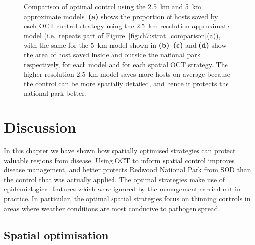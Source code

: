 \begin{figure}[H]
    \begin{center}
        \caption[Comparison of optimal control using the \SI{2.5}{\km} and \SI{5}{\km} models]{Comparison of optimal control using the \SI{2.5}{\km} and \SI{5}{\km} approximate models. \textbf{(a)} shows the proportion of hosts saved by each OCT control strategy using the \SI{2.5}{\km} resolution approximate model (i.e.\ repeats part of Figure~\ref{fig:ch7:strat_comparison}(a)), with the same for the \SI{5}{\km} model shown in \textbf{(b)}. \textbf{(c)} and \textbf{(d)} show the area of host saved inside and outside the national park respectively, for each model and for each spatial OCT strategy. The higher resolution \SI{2.5}{\km} model saves more hosts on average because the control can be more spatially detailed, and hence it protects the national park better.\label{fig:ch7:control_res_compare}}
    \end{center}
\end{figure}

\newpage
\section{Discussion}

In this chapter we have shown how spatially optimised strategies can protect valuable regions from disease. Using OCT to inform spatial control improves disease management, and better protects Redwood National Park from SOD than the control that was actually applied. The optimal strategies make use of epidemiological features which were ignored by the management carried out in practice. In particular, the optimal spatial strategies focus on thinning controls in areas where weather conditions are most conducive to pathogen spread.

\subsection{Spatial optimisation}

